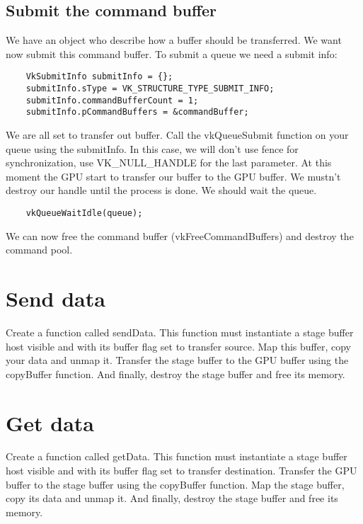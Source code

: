 \documentclass{article}
\begin{document}
\subsection{Submit the command buffer}
We have an object who describe how a buffer should be transferred. We want now submit this command buffer. To submit a queue we need a submit info:
\begin{lstlisting}
	VkSubmitInfo submitInfo = {};
	submitInfo.sType = VK_STRUCTURE_TYPE_SUBMIT_INFO;
	submitInfo.commandBufferCount = 1;
	submitInfo.pCommandBuffers = &commandBuffer;
\end{lstlisting}
We are all set to transfer out buffer. Call the vkQueueSubmit function on your queue using the submitInfo. In this case, we will don't use fence for synchronization, use VK\_NULL\_HANDLE for the last parameter. At this moment the GPU start to transfer our buffer to the GPU buffer. We mustn't destroy our handle until the process is done. We should wait the queue.
\begin{lstlisting}
	vkQueueWaitIdle(queue);
\end{lstlisting}
We can now free the command buffer (vkFreeCommandBuffers) and destroy the command pool.

\section{Send data}
Create a function called sendData. This function must instantiate a stage buffer host visible and with its buffer flag set to transfer source. Map this buffer, copy your data and unmap it. Transfer the stage buffer to the GPU buffer using the copyBuffer function. And finally, destroy the stage buffer and free its memory.

\section{Get data}
Create a function called getData. This function must instantiate a stage buffer host visible and with its buffer flag set to transfer destination. Transfer the GPU buffer to the stage buffer using the copyBuffer function. Map the stage buffer, copy its data and unmap it. And finally, destroy the stage buffer and free its memory.
\end{document}
